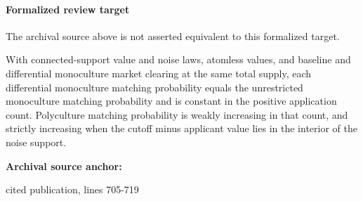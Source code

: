 \documentclass[10pt]{article}
\begin{document}
\paragraph{Formalized review target}
The archival source above is not asserted equivalent to this formalized target.
\begin{ReviewVerbatim}
With connected-support value and noise laws, atomless values, and baseline and differential monoculture market clearing at the same total supply, each differential monoculture matching probability equals the unrestricted monoculture matching probability and is constant in the positive application count. Polyculture matching probability is weakly increasing in that count, and strictly increasing when the cutoff minus applicant value lies in the interior of the noise support.
\end{ReviewVerbatim}

\textbf{Archival source anchor:} {\footnotesize\raggedright cited publication, lines 705-\allowbreak{}719\par}
\end{document}
